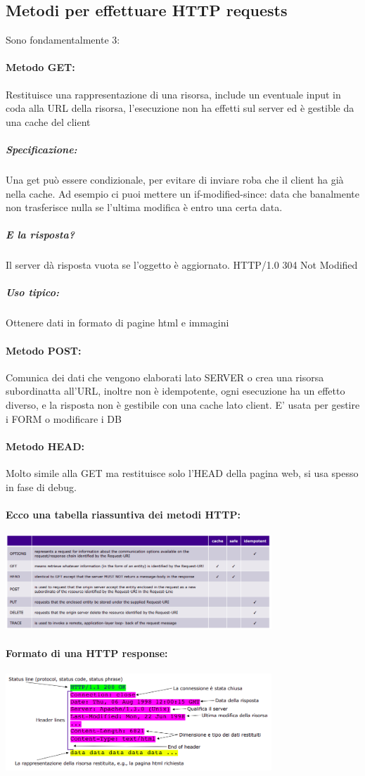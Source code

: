 \documentclass[12pt, a4paper, openany, twoside]{book}
\begin{document}
\subsection{Metodi per effettuare HTTP requests}
Sono fondamentalmente 3:
\paragraph{Metodo GET:} Restituisce una rappresentazione di una risorsa, include
un eventuale input in coda alla URL della risorsa, l'esecuzione non ha effetti sul server
ed è gestible da una cache del client
\subparagraph{Specificazione: }Una get può essere condizionale, per evitare di 
inviare roba che il client ha già nella cache. Ad esempio ci puoi mettere un
if-modified-since: data che banalmente non trasferisce nulla se l'ultima modifica
è entro una certa data. 
\subparagraph{E la risposta?} Il server dà risposta vuota se l'oggetto è aggiornato.
HTTP/1.0 304 Not Modified 		
\subparagraph{Uso tipico:} Ottenere dati in formato di pagine html e immagini
\paragraph{Metodo POST:} Comunica dei dati che vengono elaborati lato SERVER o
crea una risorsa subordinatta all'URL, inoltre non è idempotente, ogni esecuzione
ha un effetto diverso, e la risposta non è gestibile con una cache lato client.
E' usata per gestire i FORM o modificare i DB
\paragraph{Metodo HEAD:} Molto simile alla GET ma restituisce solo l'HEAD della
pagina web, si usa spesso in fase di debug.
\paragraph{Ecco una tabella riassuntiva dei metodi HTTP:} 
\begin{center}
	\includegraphics[width=0.75\textwidth]{4}
\end{center}	
\paragraph{Formato di una HTTP response:}
\begin{center}
\includegraphics[width=0.75\textwidth]{5}
\end{center}
\end{document}
